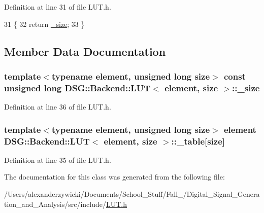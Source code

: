 Definition at line 31 of file L\+U\+T.\+h.


\begin{DoxyCode}
31                                             \{
32                 \textcolor{keywordflow}{return} \hyperlink{classDSG_1_1Backend_1_1LUT_ae18fa23936c51c1bdbd21311c9f1054e}{\_size};
33             \}
\end{DoxyCode}


\subsection{Member Data Documentation}
\hypertarget{classDSG_1_1Backend_1_1LUT_ae18fa23936c51c1bdbd21311c9f1054e}{
\subsubsection[{\+\_\+size}]{\setlength{\rightskip}{0pt plus 5cm}template$<$typename element, unsigned long size$>$ const unsigned long {\bf D\+S\+G\+::\+Backend\+::\+L\+U\+T}$<$ element, size $>$\+::\+\_\+size\hspace{0.3cm}{\ttfamily [protected]}}}\label{classDSG_1_1Backend_1_1LUT_ae18fa23936c51c1bdbd21311c9f1054e}


Definition at line 36 of file L\+U\+T.\+h.

\hypertarget{classDSG_1_1Backend_1_1LUT_a23615428e84d6be4424c8b897866f253}{
\subsubsection[{\+\_\+table}]{\setlength{\rightskip}{0pt plus 5cm}template$<$typename element, unsigned long size$>$ element {\bf D\+S\+G\+::\+Backend\+::\+L\+U\+T}$<$ element, size $>$\+::\+\_\+table\mbox{[}size\mbox{]}\hspace{0.3cm}{\ttfamily [protected]}}}\label{classDSG_1_1Backend_1_1LUT_a23615428e84d6be4424c8b897866f253}


Definition at line 35 of file L\+U\+T.\+h.



The documentation for this class was generated from the following file\+:\begin{DoxyCompactItemize}
\item 
/\+Users/alexanderzywicki/\+Documents/\+School\+\_\+\+Stuff/\+Fall\+\_/\+Digital\+\_\+\+Signal\+\_\+\+Generation\+\_\+and\+\_\+\+Analysis/src/include/\hyperlink{LUT_8h}{L\+U\+T.\+h}\end{DoxyCompactItemize}
